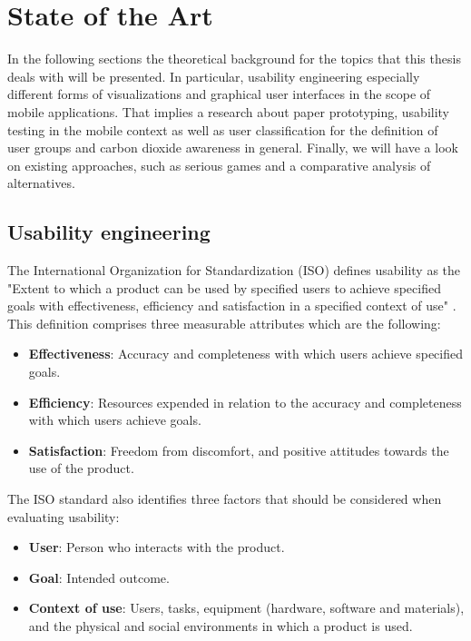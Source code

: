 \chapter{State of the Art}

In the following sections the theoretical background for the topics that this thesis deals with will be presented. In particular, usability engineering especially different forms of visualizations and graphical user interfaces in the scope of mobile applications. That implies a research about paper prototyping, usability testing in the mobile context as well as user classification for the definition of user groups and carbon dioxide awareness in general. Finally, we will have a look on existing approaches, such as serious games and a comparative analysis of alternatives.

\section{Usability engineering}

The International Organization for Standardization (ISO) defines usability as the "Extent to which a product can be used by specified users to achieve specified goals with effectiveness, efficiency and satisfaction in a specified context of use" \cite{bevan1998iso}. This definition comprises three measurable attributes which are the following:

\begin{itemize}
	\item \textbf{Effectiveness}: Accuracy and completeness with which users achieve specified goals.
	\item \textbf{Efficiency}: Resources expended in relation to the accuracy and completeness with which users achieve goals.	
	\item \textbf{Satisfaction}: Freedom from discomfort, and positive attitudes towards the use of the product.
\end{itemize}

The ISO standard also identifies three factors that should be considered when evaluating usability:
\begin{itemize}
	\item \textbf{User}: Person who interacts with the product.
	\item \textbf{Goal}: Intended outcome.
	\item \textbf{Context of use}: Users, tasks, equipment (hardware, software and materials), and the physical and social environments in which a product is used.
\end{itemize}

